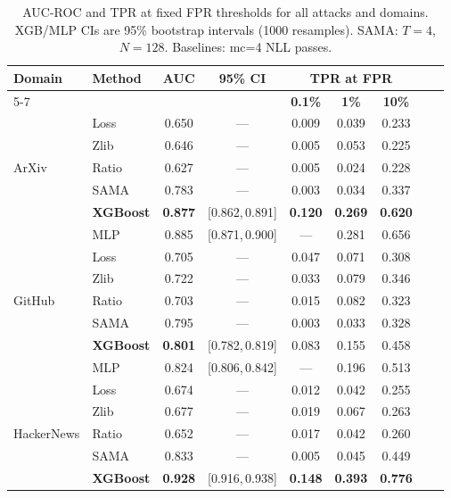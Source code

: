 \documentclass[11pt,a4paper]{article}
\begin{document}
\begin{table}[H]
\centering
\setlength{\tabcolsep}{4pt}
\caption{AUC-ROC and TPR at fixed FPR thresholds for all attacks and domains.
  XGB/MLP CIs are 95\% bootstrap intervals (1000 resamples).
  SAMA: $T=4$, $N=128$. Baselines: mc=4 NLL passes.}
\label{tab:main_results}
\small
\begin{tabular}{llccccccc}
\toprule
\multirow{2}{*}{\textbf{Domain}}
  & \multirow{2}{*}{\textbf{Method}}
  & \multirow{2}{*}{\textbf{AUC}}
  & \multirow{2}{*}{\textbf{95\% CI}}
  & \multicolumn{3}{c}{\textbf{TPR at FPR}} \\
\cmidrule(lr){5-7}
  & & & & \textbf{0.1\%} & \textbf{1\%} & \textbf{10\%} \\
\midrule
\multirow{5}{*}{ArXiv}
  & Loss      & 0.650 & --- & 0.009 & 0.039 & 0.233 \\
  & Zlib      & 0.646 & --- & 0.005 & 0.053 & 0.225 \\
  & Ratio     & 0.627 & --- & 0.005 & 0.024 & 0.228 \\
  & SAMA      & 0.783 & --- & 0.003 & 0.034 & 0.337 \\
  & \textbf{XGBoost}  & \textbf{0.877} & [0.862,\,0.891] & \textbf{0.120} & \textbf{0.269} & \textbf{0.620} \\
  & MLP       & 0.885 & [0.871,\,0.900] & --- & 0.281 & 0.656 \\
\midrule
\multirow{5}{*}{GitHub}
  & Loss      & 0.705 & --- & 0.047 & 0.071 & 0.308 \\
  & Zlib      & 0.722 & --- & 0.033 & 0.079 & 0.346 \\
  & Ratio     & 0.703 & --- & 0.015 & 0.082 & 0.323 \\
  & SAMA      & 0.795 & --- & 0.003 & 0.033 & 0.328 \\
  & \textbf{XGBoost}  & \textbf{0.801} & [0.782,\,0.819] & 0.083 & 0.155 & 0.458 \\
  & MLP       & 0.824 & [0.806,\,0.842] & --- & 0.196 & 0.513 \\
\midrule
\multirow{5}{*}{HackerNews}
  & Loss      & 0.674 & --- & 0.012 & 0.042 & 0.255 \\
  & Zlib      & 0.677 & --- & 0.019 & 0.067 & 0.263 \\
  & Ratio     & 0.652 & --- & 0.017 & 0.042 & 0.260 \\
  & SAMA      & 0.833 & --- & 0.005 & 0.045 & 0.449 \\
  & \textbf{XGBoost}  & \textbf{0.928} & [0.916,\,0.938] & \textbf{0.148} & \textbf{0.393} & \textbf{0.776} \\

\end{tabular}
\end{table}
\end{document}
